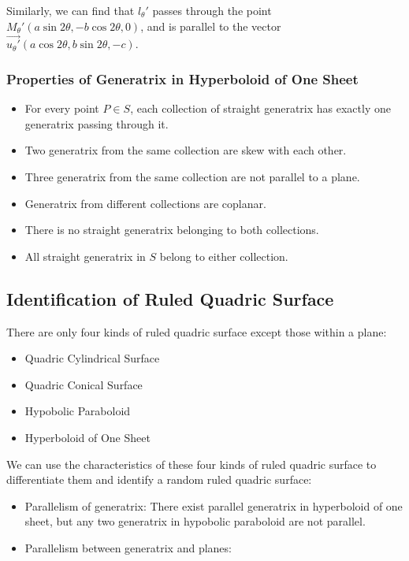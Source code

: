 \documentclass[onecolumn]{ctexart}
\begin{document}
Similarly, we can find that $l_\theta'$ passes through the point $M_\theta'
(a\sin2\theta, -b\cos2\theta, 0)$, and is parallel to the vector 
$\vec{u_\theta'}(a\cos2\theta, b\sin2\theta, -c)$.

\subsubsection{Properties of Generatrix in Hyperboloid of One Sheet}
\begin{itemize}
  \item For every point $P \in S$, each collection of straight generatrix has 
  exactly one generatrix passing through it.
  \item Two generatrix from the same collection are skew with each other.
  \item Three generatrix from the same collection are not parallel to a plane.
  \item Generatrix from different collections are coplanar.
  \item There is no straight generatrix belonging to both collections.
  \item All straight generatrix in $S$ belong to either collection.
\end{itemize}

\subsection{Identification of Ruled Quadric Surface}

There are only four kinds of ruled quadric surface except those within a plane:
\begin{itemize}
  \item Quadric Cylindrical Surface
  \item Quadric Conical Surface
  \item Hypobolic Paraboloid
  \item Hyperboloid of One Sheet
\end{itemize}

We can use the characteristics of these four kinds of ruled quadric surface to 
differentiate them and identify a random ruled quadric surface:
\begin{itemize}
  \item Parallelism of generatrix: There exist parallel generatrix in 
  hyperboloid of one sheet, but any two generatrix in hypobolic paraboloid are 
  not parallel.
  \item Parallelism between generatrix and planes: 
\end{itemize}
\end{document}
